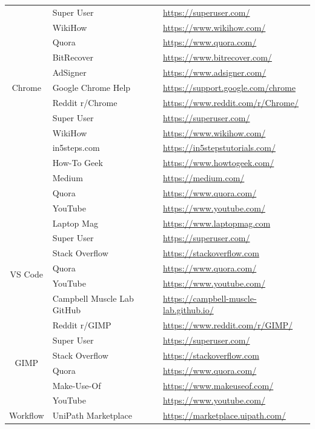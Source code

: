 \begin{longtable}{cll}
&   Super User & \url{https://superuser.com/} \\
&   WikiHow & \url{https://www.wikihow.com/} \\
&   Quora & \url{https://www.quora.com/} \\
&   BitRecover & \url{https://www.bitrecover.com/} \\
&   AdSigner & \url{https://www.adsigner.com/} \\
\hline
Chrome &    Google Chrome Help & \url{https://support.google.com/chrome} \\
&   Reddit r/Chrome & \url{https://www.reddit.com/r/Chrome/} \\
&   Super User & \url{https://superuser.com/} \\
&   WikiHow & \url{https://www.wikihow.com/} \\
&   in5steps.com & \url{https://in5stepstutorials.com/} \\
&   How-To Geek & \url{https://www.howtogeek.com/} \\
&   Medium & \url{https://medium.com/} \\
&   Quora & \url{https://www.quora.com/} \\
&   YouTube & \url{https://www.youtube.com/} \\
&   Laptop Mag & \url{https://www.laptopmag.com} \\
\hline
\multirow{5}{*}{VS Code} &   Super User & \url{https://superuser.com/} \\
&   Stack Overflow & \url{https://stackoverflow.com} \\
& Quora & \url{https://www.quora.com/} \\
&   YouTube & \url{https://www.youtube.com/} \\
&   Campbell Muscle Lab GitHub & \url{https://campbell-muscle-lab.github.io/} \\
\hline
\multirow{6}{*}{GIMP} &   Reddit r/GIMP & \url{https://www.reddit.com/r/GIMP/} \\
&   Super User & \url{https://superuser.com/} \\
&   Stack Overflow & \url{https://stackoverflow.com} \\
& Quora & \url{https://www.quora.com/} \\
&   Make-Use-Of & \url{https://www.makeuseof.com/} \\
&   YouTube & \url{https://www.youtube.com/} \\
\hline
\multirow{18}{*}{Workflow} & UniPath Marketplace & \url{https://marketplace.uipath.com/} \\

\end{longtable}
